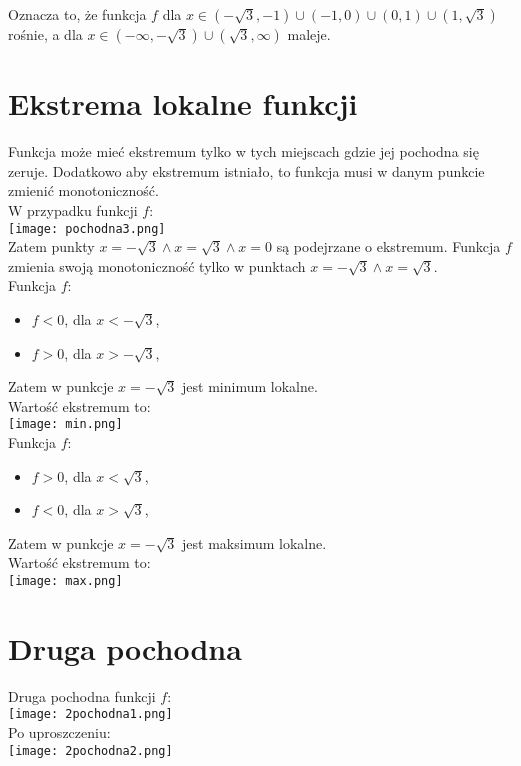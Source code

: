 \documentclass[a4paper,10pt]{article}
\begin{document}
Oznacza to, że funkcja $f$ dla $ x \in (-\sqrt{3},-1)\cup(-1,0)\cup(0,1)\cup(1,\sqrt{3})$ rośnie, a dla $ x \in (-\infty,-\sqrt{3})\cup(\sqrt{3},\infty)$ maleje.

\section{Ekstrema lokalne funkcji}
Funkcja może mieć ekstremum tylko w tych miejscach gdzie jej pochodna się zeruje. Dodatkowo aby ekstremum istniało, to funkcja musi w danym punkcie zmienić monotoniczność.\\

W przypadku funkcji $f$:\\
\texttt{[image: pochodna3.png]}\\


Zatem punkty $ x=-\sqrt{3} \land x=\sqrt{3} \land x=0 $ są podejrzane o ekstremum. Funkcja $f$ zmienia swoją monotoniczność tylko w punktach $ x=-\sqrt{3} \land x=\sqrt{3} $.\\

Funkcja $f$:
\begin{itemize}
	\item $f < 0$, dla $x<-\sqrt{3}$,
	\item $f > 0$, dla $x>-\sqrt{3}$,
\end{itemize}
Zatem w punkcje $x=-\sqrt{3}$ jest minimum lokalne.\\

Wartość ekstremum to:\\
\texttt{[image: min.png]}\\

Funkcja $f$:
\begin{itemize}
	\item $f > 0$, dla $x<\sqrt{3}$,
	\item $f < 0$, dla $x>\sqrt{3}$,
\end{itemize}
Zatem w punkcje $x=-\sqrt{3}$ jest maksimum lokalne.\\

Wartość ekstremum to:\\
\texttt{[image: max.png]}


\section{Druga pochodna}
Druga pochodna funkcji  $ f $:\\
\texttt{[image: 2pochodna1.png]}\\
Po uproszczeniu:\\
\texttt{[image: 2pochodna2.png]}\\
\end{document}
